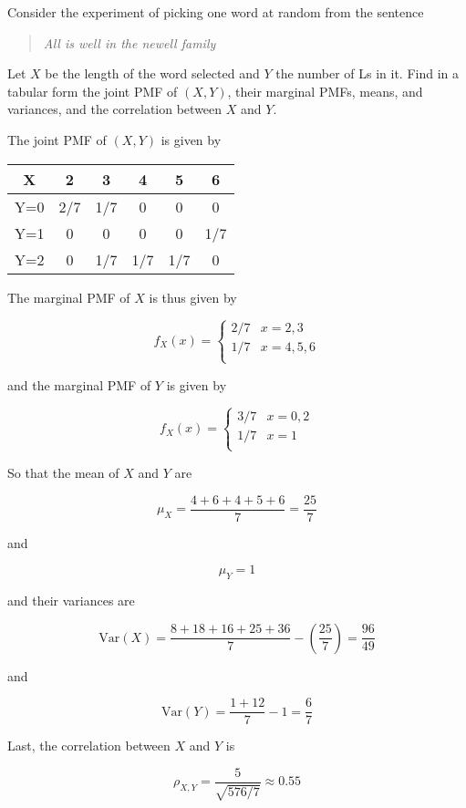 \begin{problem}[Handout 15, \# 10]
  Consider the experiment of picking one word at random from the sentence
  \begin{quote}
    \textsl{All is well in the newell family}
  \end{quote}
  Let \(X\) be the length of the word selected and \(Y\) the number of Ls
  in it. Find in a tabular form the joint PMF of \((X,Y)\), their marginal
  PMFs, means, and variances, and the correlation between \(X\) and \(Y\).
\end{problem}
\begin{solution}

The joint PMF of $(X,Y)$ is given by


\begin{center}
 \begin{tabular}{|c||c|c|c|c|c|} 
 \hline
 X& 2 & 3 & 4 & 5 & 6 \\ [0.5ex] 
 \hline\hline
 Y=0 & 2/7 & 1/7  & 0 & 0 & 0 \\
 \hline
 Y=1& 0 & 0 & 0 & 0 & 1/7\\
 \hline
 Y=2& 0 & 1/7 & 1/7 & 1/7 & 0 \\ [1ex] 
 \hline
\end{tabular}
\end{center}


The marginal PMF of $X$ is thus given by

\[   f_X(x) = \left\{
\begin{array}{ll}
      2/7 & x=2,3 \\
      1/7 & x=4,5,6 \\
\end{array} 
\right. \]

and the marginal PMF of $Y$ is given by

\[   f_X(x) = \left\{
\begin{array}{ll}
      3/7 & x=0,2 \\
      1/7 & x=1 \\
\end{array} 
\right. \]

So that the mean of $X$ and $Y$ are

\[
\mu_X = \frac{4+6+4+5+6}{7} = \frac{25}{7}
\]

and

\[
\mu_Y = 1
\]

and their variances are

\[
\text{Var}(X) = \frac{8+18+16+25+36}{7} - \left(\frac{25}{7}\right) = \frac{96}{49}
\]

and

\[
\text{Var}(Y) = \frac{1+12}{7} - 1 = \frac{6}{7}
\]


Last, the correlation between $X$ and $Y$ is

\[
\rho_{X,Y} = \frac{5}{\sqrt{576/7}} \approx 0.55
\]
\end{solution}
\newpage

